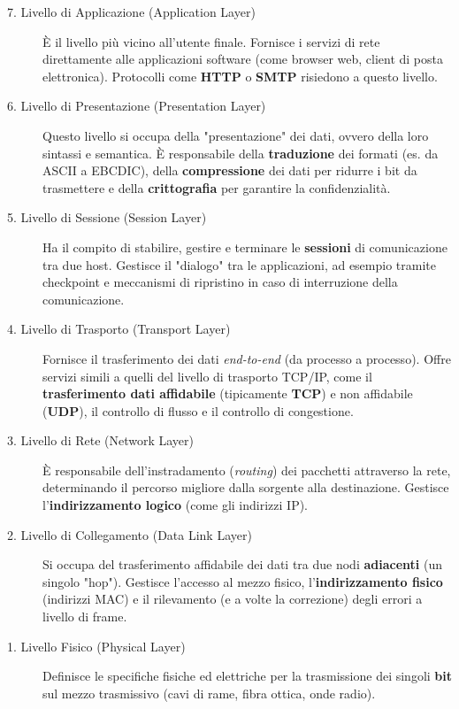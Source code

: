 \begin{description}
    \item[7. Livello di Applicazione (Application Layer)] È il livello più vicino all'utente finale. Fornisce i servizi di rete direttamente alle applicazioni software (come browser web, client di posta elettronica). Protocolli come \textbf{HTTP} o \textbf{SMTP} risiedono a questo livello.

    \item[6. Livello di Presentazione (Presentation Layer)] Questo livello si occupa della "presentazione" dei dati, ovvero della loro sintassi e semantica. È responsabile della \textbf{traduzione} dei formati (es. da ASCII a EBCDIC), della \textbf{compressione} dei dati per ridurre i bit da trasmettere e della \textbf{crittografia} per garantire la confidenzialità.

    \item[5. Livello di Sessione (Session Layer)] Ha il compito di stabilire, gestire e terminare le \textbf{sessioni} di comunicazione tra due host. Gestisce il "dialogo" tra le applicazioni, ad esempio tramite checkpoint e meccanismi di ripristino in caso di interruzione della comunicazione.

    \item[4. Livello di Trasporto (Transport Layer)] Fornisce il trasferimento dei dati \textit{end-to-end} (da processo a processo). Offre servizi simili a quelli del livello di trasporto TCP/IP, come il \textbf{trasferimento dati affidabile} (tipicamente \textbf{TCP}) e non affidabile (\textbf{UDP}), il controllo di flusso e il controllo di congestione.

    \item[3. Livello di Rete (Network Layer)] È responsabile dell'instradamento (\textit{routing}) dei pacchetti attraverso la rete, determinando il percorso migliore dalla sorgente alla destinazione. Gestisce l'\textbf{indirizzamento logico} (come gli indirizzi IP).

    \item[2. Livello di Collegamento (Data Link Layer)] Si occupa del trasferimento affidabile dei dati tra due nodi \textbf{adiacenti} (un singolo "hop"). Gestisce l'accesso al mezzo fisico, l'\textbf{indirizzamento fisico} (indirizzi MAC) e il rilevamento (e a volte la correzione) degli errori a livello di frame.

    \item[1. Livello Fisico (Physical Layer)] Definisce le specifiche fisiche ed elettriche per la trasmissione dei singoli \textbf{bit} sul mezzo trasmissivo (cavi di rame, fibra ottica, onde radio).
\end{description}


